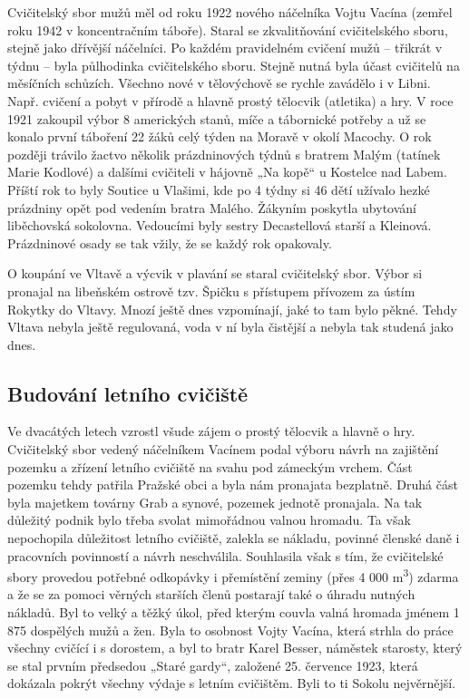 Cvičitelský sbor mužů měl od roku 1922 nového náčelníka Vojtu Vacína
(zemřel roku 1942 v koncentračním táboře). Staral se zkvalitňování
cvičitelského sboru, stejně jako dřívější náčelníci. Po každém
pravidelném cvičení mužů -- třikrát v týdnu -- byla půlhodinka
cvičitelského sboru. Stejně nutná byla účast cvičitelů na měsíčních
schůzích. Všechno nové v tělovýchově se rychle zavádělo i v Libni. Např.
cvičení a pobyt v přírodě a hlavně prostý tělocvik (atletika) a hry. V
roce 1921 zakoupil výbor 8 amerických stanů, míče a tábornické potřeby a
už se konalo první táboření 22 žáků celý týden na Moravě v okolí
Macochy. O rok později trávilo žactvo několik prázdninových týdnů s
bratrem Malým (tatínek Marie Kodlové) a dalšími cvičiteli v hájovně „Na
kopě`` u Kostelce nad Labem. Příští rok to byly Soutice u Vlašimi, kde
po 4 týdny si 46 dětí užívalo hezké prázdniny opět pod vedením bratra
Malého. Žákyním poskytla ubytování liběchovská sokolovna. Vedoucími byly
sestry Decastellová starší a Kleinová. Prázdninové osady se tak vžily,
že se každý rok opakovaly.

O koupání ve Vltavě a výcvik v plavání se staral cvičitelský sbor. Výbor
si pronajal na libeňském ostrově tzv. Špičku s přístupem přívozem za
ústím Rokytky do Vltavy. Mnozí ještě dnes vzpomínají, jaké to tam bylo
pěkné. Tehdy Vltava nebyla ještě regulovaná, voda v ní byla čistější a
nebyla tak studená jako dnes.

\subsection{Budování letního
cvičiště}\label{budovuxe1nuxed-letnuxedho-cviux10diux161tux11b}

Ve dvacátých letech vzrostl všude zájem o prostý tělocvik a hlavně o
hry. Cvičitelský sbor vedený náčelníkem Vacínem podal výboru návrh na
zajištění pozemku a zřízení letního cvičiště na svahu pod zámeckým
vrchem. Část pozemku tehdy patřila Pražské obci a byla nám pronajata
bezplatně. Druhá část byla majetkem továrny Grab a synové, pozemek
jednotě pronajala. Na tak důležitý podnik bylo třeba svolat mimořádnou
valnou hromadu. Ta však nepochopila důležitost letního cvičiště, zalekla
se nákladu, povinné členské daně i pracovních povinností a návrh
neschválila. Souhlasila však s tím, že cvičitelské sbory provedou
potřebné odkopávky i přemístění zeminy (přes 4 000 m\textsuperscript{3})
zdarma a že se za pomoci věrných starších členů postarají také o úhradu
nutných nákladů. Byl to velký a těžký úkol, před kterým couvla valná
hromada jménem 1 875 dospělých mužů a žen. Byla to osobnost Vojty
Vacína, která strhla do práce všechny cvičící i s dorostem, a byl to
bratr Karel Besser, náměstek starosty, který se stal prvním předsedou
„Staré gardy``, založené 25. července 1923, která dokázala pokrýt
všechny výdaje s letním cvičištěm. Byli to ti Sokolu nejvěrnější.

